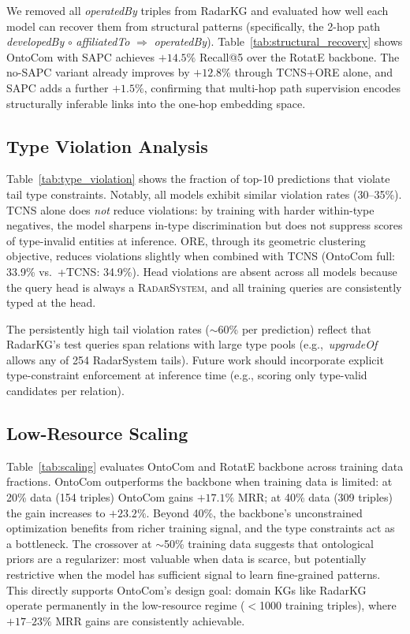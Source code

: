 \documentclass[10pt,twocolumn]{article}
\begin{document}
We removed all \textit{operatedBy} triples from RadarKG and evaluated how well
each model can recover them from structural patterns (specifically, the 2-hop path
\textit{developedBy} $\circ$ \textit{affiliatedTo} $\Rightarrow$ \textit{operatedBy}).
Table~\ref{tab:structural_recovery} shows OntoCom with SAPC achieves
$+14.5\%$ Recall@5 over the RotatE backbone.
The no-SAPC variant already improves by $+12.8\%$ through TCNS+ORE alone,
and SAPC adds a further $+1.5\%$, confirming that multi-hop path supervision
encodes structurally inferable links into the one-hop embedding space.

\subsection{Type Violation Analysis}

Table~\ref{tab:type_violation} shows the fraction of top-10 predictions that
violate tail type constraints. Notably, all models exhibit similar violation rates
(30--35\%). TCNS alone does \emph{not} reduce violations: by training with
harder within-type negatives, the model sharpens in-type discrimination but does
not suppress scores of type-invalid entities at inference.
ORE, through its geometric clustering objective, reduces violations slightly when
combined with TCNS (OntoCom full: 33.9\% vs.\ +TCNS: 34.9\%).
Head violations are absent across all models because the query head is always a
\textsc{RadarSystem}, and all training queries are consistently typed at the head.

The persistently high tail violation rates ($\sim$60\% per prediction)
reflect that RadarKG's test queries span relations with large type pools
(e.g.,\ \textit{upgradeOf} allows any of 254 RadarSystem tails).
Future work should incorporate explicit type-constraint enforcement at inference
time (e.g., scoring only type-valid candidates per relation).

\subsection{Low-Resource Scaling}

Table~\ref{tab:scaling} evaluates OntoCom and RotatE backbone across training
data fractions. OntoCom outperforms the backbone when training data is limited:
at 20\% data (154 triples) OntoCom gains $+17.1\%$ MRR;
at 40\% data (309 triples) the gain increases to $+23.2\%$.
Beyond 40\%, the backbone's unconstrained optimization benefits from richer
training signal, and the type constraints act as a bottleneck.
The crossover at $\sim$50\% training data suggests that ontological priors are
a regularizer: most valuable when data is scarce, but potentially restrictive
when the model has sufficient signal to learn fine-grained patterns.
This directly supports OntoCom's design goal: domain KGs like RadarKG operate
permanently in the low-resource regime ($<$1000 training triples), where
$+17$--$23\%$ MRR gains are consistently achievable.
\end{document}

